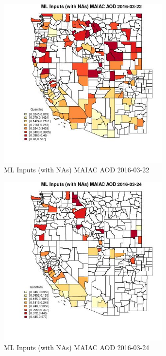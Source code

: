 \begin{figure} 
\centering  
\includegraphics[width=0.77\textwidth]{Code_Outputs/Report_ML_input_PM25_Step4_part_e_de_duplicated_aveswNAs_CountyMAIAC_AODMean2016-03-22_2016-03-22.jpg} 
\caption{\label{fig:Report_ML_input_PM25_Step4_part_e_de_duplicated_aveswNAsCountyMAIAC_AODMean2016-03-22_2016-03-22}ML Inputs (with NAs) MAIAC AOD 2016-03-22} 
\end{figure} 
 

\begin{figure} 
\centering  
\includegraphics[width=0.77\textwidth]{Code_Outputs/Report_ML_input_PM25_Step4_part_e_de_duplicated_aveswNAs_CountyMAIAC_AODMean2016-03-24_2016-03-24.jpg} 
\caption{\label{fig:Report_ML_input_PM25_Step4_part_e_de_duplicated_aveswNAsCountyMAIAC_AODMean2016-03-24_2016-03-24}ML Inputs (with NAs) MAIAC AOD 2016-03-24} 
\end{figure} 
 

